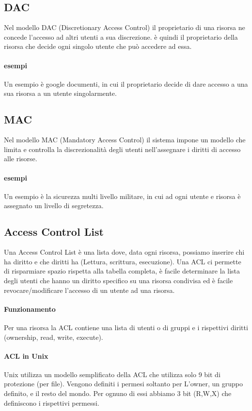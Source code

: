 \documentclass[12pt, a4paper, openany]{book}
\begin{document}
\subsection{DAC}
Nel modello DAC (Discretionary Access Control) il proprietario di una risorsa ne concede l'accesso ad altri utenti a sua discrezione. 
è quindi il proprietario della risorsa che decide ogni singolo utente che può accedere ad essa.
\paragraph*{esempi} Un esempio è google documenti, in cui il proprietario decide di dare accesso a una sua risorsa a un utente singolarmente.

\subsection{MAC} 
Nel modello MAC (Mandatory Access Control) il sistema impone un modello che limita e controlla la discrezionalità degli utenti nell'assegnare i diritti di accesso alle risorse.
\paragraph*{esempi} Un esempio è la sicurezza multi livello militare, in cui ad ogni utente e risorsa è assegnato un livello di segretezza.

\subsection{Access Control List}
Una Access Control List è una lista dove, data ogni risorsa, possiamo inserire chi ha diritto e che diritti ha (Lettura, scrittura, esecuzione).
Una ACL ci permette di risparmiare spazio rispetta alla tabella completa, è facile determinare la lista degli utenti che hanno un diritto specifico su una risorsa condivisa ed è facile revocare/modificare l'accesso di un utente ad una risorsa.

\paragraph{Funzionamento} Per una risorsa la ACL contiene una lista di utenti o di gruppi e i rispettivi diritti (ownership, read, write, execute).

\paragraph{ACL in Unix}
Unix utilizza un modello semplificato della ACL che utilizza solo 9 bit di protezione (per file).
Vengono definiti i permesi soltanto per L'owner, un gruppo definito, e il resto del mondo. Per ognuno di essi abbiamo 3 bit (R,W,X) che definiscono i rispettivi permessi.
\end{document}
